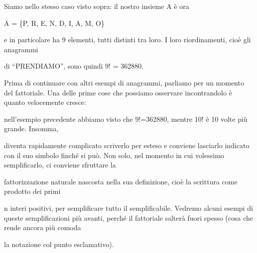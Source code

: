 \documentclass[a4paper,portrait,12pt]{article}
\begin{document}
\begin{flushleft}
Siamo nello stesso caso visto sopra: il nostro insieme A \`{e} ora
\end{flushleft}


\begin{flushleft}
A = \{P, R, E, N, D, I, A, M, O\}
\end{flushleft}


\begin{flushleft}
e in particolare ha 9 elementi, tutti distinti tra loro. I loro riordinamenti, cio\`{e} gli anagrammi
\end{flushleft}


\begin{flushleft}
di ``PRENDIAMO'', sono quindi 9! = 362880.
\end{flushleft}





\begin{flushleft}
Prima di continuare con altri esempi di anagrammi, parliamo per un momento del fattoriale. Una delle prime cose che possiamo osservare incontrandolo \`{e} quanto velocemente cresce:
\end{flushleft}


\begin{flushleft}
nell'esempio precedente abbiamo visto che 9!=362880, mentre 10! \`{e} 10 volte più grande. Insomma,
\end{flushleft}


\begin{flushleft}
diventa rapidamente complicato scriverlo per esteso e conviene lasciarlo indicato con il suo simbolo finch\'{e} si pu\`{o}. Non solo, nel momento in cui volessimo semplificarlo, ci conviene sfruttare la
\end{flushleft}


\begin{flushleft}
fattorizzazione naturale nascosta nella sua definizione, cio\`{e} la scrittura come prodotto dei primi
\end{flushleft}


\begin{flushleft}
n interi positivi, per semplificare tutto il semplificabile. Vedremo alcuni esempi di queste semplificazioni più avanti, perch\'{e} il fattoriale salter\`{a} fuori spesso (cosa che rende ancora più comoda
\end{flushleft}


\begin{flushleft}
la notazione col punto esclamativo).
\end{flushleft}
\end{document}
